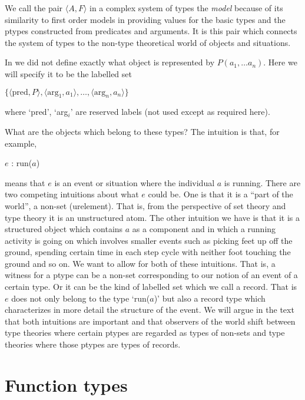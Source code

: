 We call the pair $\langle A,F\rangle$ in a complex system of types the
\textit{model} because of its similarity to first order models in
providing values for the basic types and the ptypes constructed from
predicates and arguments.  It is this pair which connects the system
of types to the non-type theoretical world of objects and situations.

In \cite{Cooper2012} we did not define exactly what object is
represented by $P(a_1,\ldots a_n)$.  Here we will specify it to be the
labelled set

$\{\langle\mathrm{pred},P\rangle,\langle\mathrm{arg}_1,a_1\rangle,\ldots,\langle\mathrm{arg}_n,a_n\rangle\}$

where `pred', `arg$_i$' are reserved labels (not used except as
required here).

What are the objects which belong to these types?  The intuition is
that, for example,

$e$ : run($a$)

means that $e$ is an event or situation where the individual $a$ is
running.  There are two competing intuitions about what $e$ could be.
One is that it is a ``part of the world'', a non-set (urelement).  That is, from
the perspective of set theory and type theory it is an unstructured
atom.  The other intuition we have is that it is a structured object which
contains $a$ as a component and in which a running activity is going
on which involves smaller events such as picking feet up off the
ground, spending certain time in each step cycle with neither foot
touching the ground and so on.  We want to allow for both of these
intuitions.  That is, a witness for a ptype can be a non-set
corresponding to our notion of an event of a certain type.  Or it can
be the kind of labelled set which we call a record.  That is $e$ does
not only belong to the type `run($a$)' but also a record type which
characterizes in more detail the structure of the event.  We will
argue in the text that both intuitions are important and that
observers of the world shift between type theories where certain
ptypes are regarded as types of non-sets and type theories where those
ptypes are types of records.


\section{Function types}
\label{app:funtypes}

